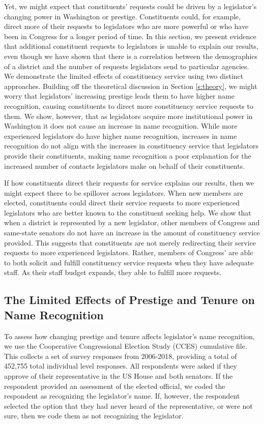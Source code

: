 \documentclass[12pt]{article}
\begin{document}
Yet, we might expect that constituents' requests could be driven by a legislator's changing power in Washington or prestige. Constituents could, for example, direct more of their requests to legislators who are more powerful or who have been in Congress for a longer period of time. In this section, we present evidence that additional constituent requests to legislators is unable to explain our results, even though we have shown that there is a correlation between the demographics of a district and the number of requests legislators send to particular agencies. We demonstrate the limited effects of constituency service using two distinct approaches. Building off the theoretical discussion in Section \ref{s:theory}, we might worry that legislators' increasing prestige leads them to have higher name recognition, causing constituents to direct more constituency service requests to them. We show, however, that as legislators acquire more institutional power in Washington it does not cause an increase in name recognition. While more experienced legislators do have higher name recognition, increases in name recognition do not align with the increases in constituency service that legislators provide their constituents, making name recognition a poor explanation for the increased number of contacts legislators make on behalf of their constituents.  

If how constituents direct their requests for service explains our results, then we might expect there to be spillover across legislators. When new members are elected, constituents could direct their service requests to more experienced legislators who are better known to the constituent seeking help. We show that when a district is represented by a new legislator, other members of Congress and same-state senators do not have an increase in the amount of constituency service provided. This suggests that constituents are not merely redirecting their service requests to more experienced legislators. Rather, members of Congress' are able to both solicit and fulfill constituency service requests when they have adequate staff. As their staff budget expands, they able to fulfill more requests.  

\subsection{The Limited Effects of Prestige and Tenure on Name Recognition}
To assess how changing prestige and tenure affects legislator's name recognition, we use the Cooperative Congressional Election Study (CCES) cumulative file. This collects a set of survey responses from 2006-2018, providing a total of 452,755 total individual level responses. All respondents were asked if they approve of their representative in the US House and both senators. If the respondent provided an assessment of the elected official, we coded the respondent as recognizing the legislator's name. If, however, the respondent selected the option that they had never heard of the representative, or were not sure, then we code them as not recognizing the legislator.  
\end{document}
